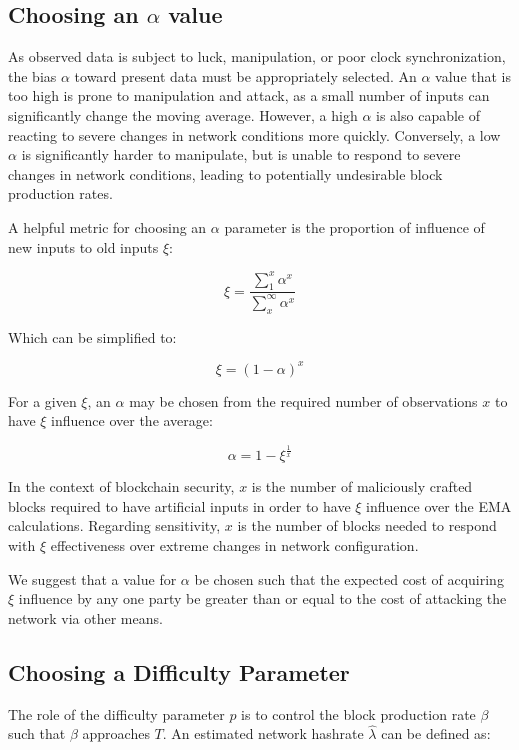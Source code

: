 \documentclass[]{article}
\begin{document}
\subsection{Choosing an $\alpha$ value}

As observed data is subject to luck, manipulation, or poor clock synchronization, the bias $\alpha$ toward present data must be appropriately selected.  An $\alpha$ value that is too high is prone to manipulation and attack, as a small number of inputs can significantly change the moving average.  However, a high $\alpha$ is also capable of reacting to severe changes in network conditions more quickly.  Conversely, a low $\alpha$ is significantly harder to manipulate, but is unable to respond to severe changes in network conditions, leading to potentially undesirable block production rates.
\newline 

 A helpful metric for choosing an $\alpha$ parameter is the proportion of influence of new inputs to old inputs $\xi$:

\begin{equation}
\xi = \frac{\sum_{1}^{x} \alpha^x}{\sum_{x}^{\infty} \alpha^x}
\end{equation}

Which can be simplified to: 

\begin{equation}
	\xi = (1 - \alpha)^x
\end{equation}

For a given $\xi$, an $\alpha$ may be chosen from the required number of observations $x$ to have $\xi$ influence over the average: 

\begin{equation}
\alpha = 1 - \xi^\frac{1}{x}
\end{equation}

In the context of blockchain security, $x$ is the number of maliciously crafted blocks required to have artificial inputs in order to have $\xi$ influence over the EMA calculations.  Regarding sensitivity, $x$ is the number of blocks needed to respond with $\xi$ effectiveness over extreme changes in network configuration.  
\newline

We suggest that a value for $\alpha$ be chosen such that the expected cost of acquiring $\xi$ influence by any one party be greater than or equal to the cost of attacking the network via other means.  

\subsection{Choosing a Difficulty Parameter}
The role of the difficulty parameter $p$ is to control the block production rate $\beta$ such that $\beta$ approaches $T$.  An estimated network hashrate $\hat{\lambda}$ can be defined as: 
\end{document}
